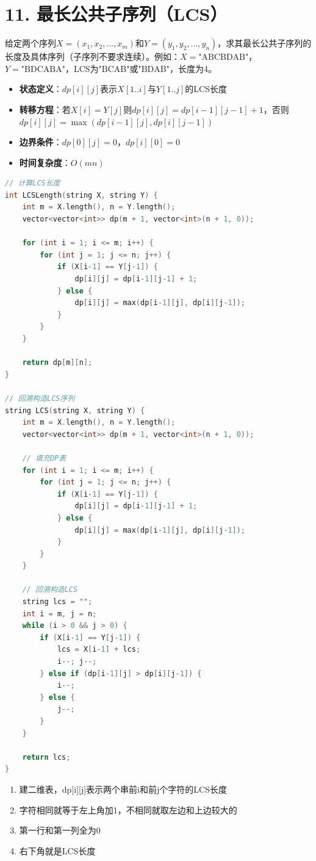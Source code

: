 \section*{11. 最长公共子序列（LCS）}

给定两个序列$X=(x_1,x_2,\ldots,x_m)$和$Y=(y_1,y_2,\ldots,y_n)$，求其最长公共子序列的长度及具体序列（子序列不要求连续）。例如：$X=\text{"ABCBDAB"}$，$Y=\text{"BDCABA"}$，LCS为$\text{"BCAB"}$或$\text{"BDAB"}$，长度为4。



\begin{itemize}
    \item \textbf{状态定义}：$dp[i][j]$表示$X[1..i]$与$Y[1..j]$的LCS长度
    \item \textbf{转移方程}：若$X[i]=Y[j]$则$dp[i][j]=dp[i-1][j-1]+1$，否则$dp[i][j]=\max(dp[i-1][j],dp[i][j-1])$
    \item \textbf{边界条件}：$dp[0][j] = 0$，$dp[i][0] = 0$
    \item \textbf{时间复杂度}：$O(mn)$
\end{itemize}
\begin{lstlisting}[language=C++, style=cppstyle]
// 计算LCS长度
int LCSLength(string X, string Y) {
    int m = X.length(), n = Y.length();
    vector<vector<int>> dp(m + 1, vector<int>(n + 1, 0));

    for (int i = 1; i <= m; i++) {
        for (int j = 1; j <= n; j++) {
            if (X[i-1] == Y[j-1]) {
                dp[i][j] = dp[i-1][j-1] + 1;
            } else {
                dp[i][j] = max(dp[i-1][j], dp[i][j-1]);
            }
        }
    }

    return dp[m][n];
}

// 回溯构造LCS序列
string LCS(string X, string Y) {
    int m = X.length(), n = Y.length();
    vector<vector<int>> dp(m + 1, vector<int>(n + 1, 0));

    // 填充DP表
    for (int i = 1; i <= m; i++) {
        for (int j = 1; j <= n; j++) {
            if (X[i-1] == Y[j-1]) {
                dp[i][j] = dp[i-1][j-1] + 1;
            } else {
                dp[i][j] = max(dp[i-1][j], dp[i][j-1]);
            }
        }
    }

    // 回溯构造LCS
    string lcs = "";
    int i = m, j = n;
    while (i > 0 && j > 0) {
        if (X[i-1] == Y[j-1]) {
            lcs = X[i-1] + lcs;
            i--; j--;
        } else if (dp[i-1][j] > dp[i][j-1]) {
            i--;
        } else {
            j--;
        }
    }

    return lcs;
}
\end{lstlisting}


\begin{enumerate}
    \item 建二维表，dp[i][j]表示两个串前i和前j个字符的LCS长度
    \item 字符相同就等于左上角加1，不相同就取左边和上边较大的
    \item 第一行和第一列全为0
    \item 右下角就是LCS长度
\end{enumerate}

